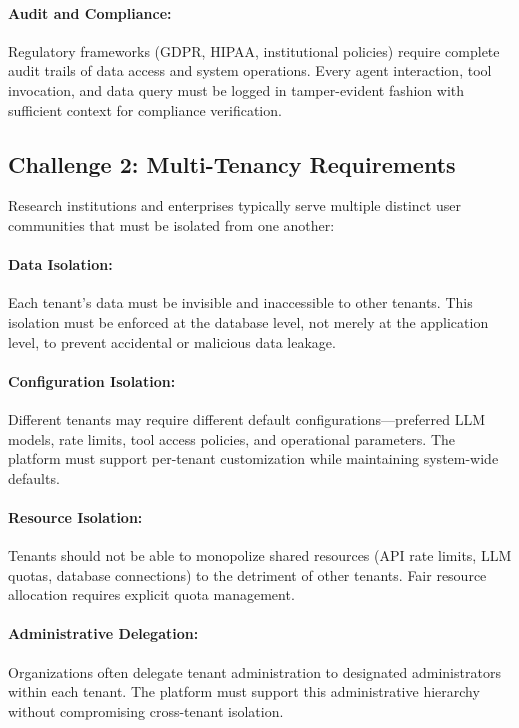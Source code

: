 \documentclass[a4paper,twoside]{sapthesis}
\begin{document}
\paragraph{Audit and Compliance:}
Regulatory frameworks (GDPR, HIPAA, institutional policies) require complete audit trails of data access and system operations. Every agent interaction, tool invocation, and data query must be logged in tamper-evident fashion with sufficient context for compliance verification.

\subsection{Challenge 2: Multi-Tenancy Requirements}

Research institutions and enterprises typically serve multiple distinct user communities that must be isolated from one another:

\paragraph{Data Isolation:}
Each tenant's data must be invisible and inaccessible to other tenants. This isolation must be enforced at the database level, not merely at the application level, to prevent accidental or malicious data leakage.

\paragraph{Configuration Isolation:}
Different tenants may require different default configurations---preferred LLM models, rate limits, tool access policies, and operational parameters. The platform must support per-tenant customization while maintaining system-wide defaults.

\paragraph{Resource Isolation:}
Tenants should not be able to monopolize shared resources (API rate limits, LLM quotas, database connections) to the detriment of other tenants. Fair resource allocation requires explicit quota management.

\paragraph{Administrative Delegation:}
Organizations often delegate tenant administration to designated administrators within each tenant. The platform must support this administrative hierarchy without compromising cross-tenant isolation.
\end{document}
